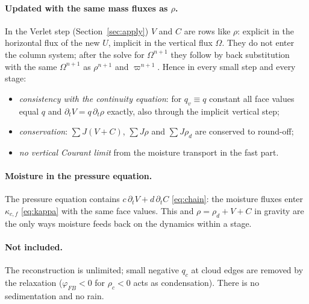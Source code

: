 \documentclass[11pt,a4paper]{article}
\newcommand{\pv}{\varpi}      %
\begin{document}
\paragraph{Updated with the same mass fluxes as $\rho$.} In the Verlet step (Section~\ref{sec:apply})
$V$ and $C$ are rows like $\rho$: explicit in the horizontal flux of the new $U$, implicit in the vertical
flux $\Omega$. They do not enter the column system; after the solve for $\Omega^{n+1}$ they follow by back
substitution with the same $\Omega^{n+1}$ as $\rho^{n+1}$ and $\pv^{n+1}$. Hence in every small step and every
stage:
\begin{itemize}
\item \emph{consistency with the continuity equation}: for $q_v\equiv q$ constant all face values equal
$q$ and $\partial_tV=q\,\partial_t\rho$ exactly, also through the implicit vertical step;
\item \emph{conservation}: $\sum J(V+C)$, $\sum J\rho$ and $\sum J\rho_d$ are conserved to round-off;
\item \emph{no vertical Courant limit} from the moisture transport in the fast part.
\end{itemize}

\paragraph{Moisture in the pressure equation.} The pressure equation contains $c\,\partial_tV+d\,\partial_tC$
\eqref{eq:chain}: the moisture fluxes enter $\kappa_{c,f}$ \eqref{eq:kappa} with the same face values. This
and $\rho=\rho_d+V+C$ in gravity are the only ways moisture feeds back on the dynamics within a stage.

\paragraph{Not included.} The reconstruction is unlimited; small negative $q_c$ at cloud edges are
removed by the relaxation ($\varphi_{FB}<0$ for $\rho_c<0$ acts as condensation). There is no
sedimentation and no rain.

\end{document}
